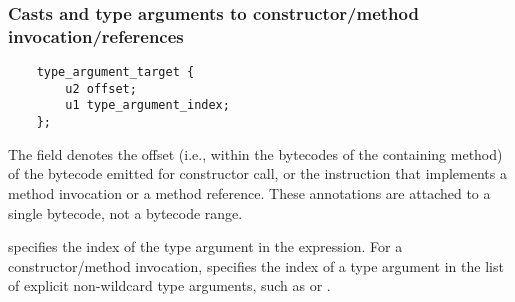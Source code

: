 \documentclass[10pt]{article}
\newcommand{\preverbnegspace}{\vspace{-5pt}}
\begin{document}



\subsubsection{Casts and type arguments to constructor/method invocation/references\label{class-file:ext:ri:cast}\label{class-file:ext:ri:con-typearg}\label{class-file:ext:ri:mref-typearg}\label{class-file:ext:ri:cref-typearg}}


\preverbnegspace
\begin{Verbatim}
    type_argument_target {
        u2 offset;
        u1 type_argument_index;
    };
\end{Verbatim}

The  field denotes the offset (i.e., within the bytecodes
of the containing method) of the  bytecode emitted for
constructor call, or the
instruction that implements a
method invocation or a method reference.  These annotations
are attached to a single bytecode, not a bytecode range.

 specifies the index of the type argument in the
expression.  
For a constructor/method invocation,  specifies
the index of a type argument in the list of explicit non-wildcard type
arguments, such as
 or .
\end{document}
